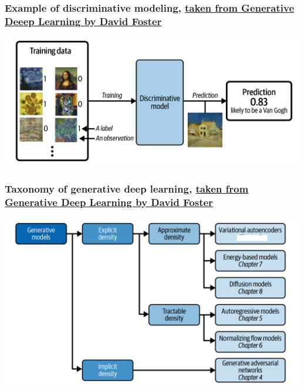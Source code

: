 \documentclass{beamer}
\begin{document}
\begin{frame}
\frametitle{Example of discriminative modeling, \href{{https://www.oreilly.com/library/view/generative-deep-learning/9781098134174/ch01.html}}{taken from Generative Deeep Learning by David Foster}}

\vspace{6mm}

\centerline{\includegraphics[width=1.0\linewidth]{figures/standarddeeplearning.png}}

\vspace{6mm}
\end{frame}

\begin{frame}
\frametitle{Taxonomy of generative deep learning, \href{{https://www.oreilly.com/library/view/generative-deep-learning/9781098134174/ch01.html}}{taken from Generative Deep Learning by David Foster}}

\vspace{6mm}

\centerline{\includegraphics[width=1.0\linewidth]{figures/generativemodels.png}}

\vspace{6mm}
\end{frame}
\end{document}
